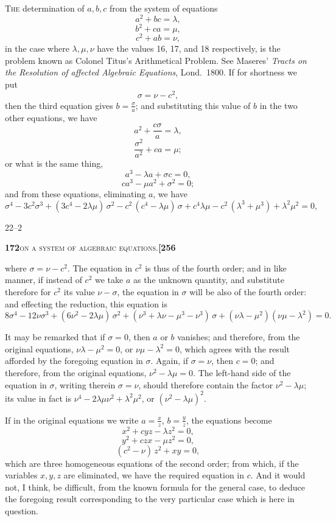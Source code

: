 \documentclass[11pt]{article}
\begin{document}
\textsc{The} determination of $a, b, c$ from the system of equations
\[
a^2 + bc = \lambda,
\]
\[
b^2 + ca = \mu,
\]
\[
c^2 + ab = \nu,
\]
in the case where $\lambda, \mu, \nu$ have the values 16, 17, and 18 respectively, is the problem known as Colonel Titus's Arithmetical Problem. See Maseres' \textit{Tracts on the Resolution of affected Algebraic Equations}, Lond.\ 1800. If for shortness we put
\[
\sigma = \nu - c^2,
\]
then the third equation gives $b = \tfrac{\sigma}{a}$; and substituting this value of $b$ in the two other equations, we have
\[
a^2 + \frac{c\sigma}{a} = \lambda,
\]
\[
\frac{\sigma^2}{a^2} + ca = \mu;
\]
or what is the same thing,
\[
a^3 - \lambda a + \sigma c = 0,
\]
\[
ca^3 - \mu a^2 + \sigma^2 = 0;
\]
and from these equations, eliminating $a$, we have
\[
\sigma^4 - 3c^2\sigma^3 + (3c^4 - 2\lambda\mu)\,\sigma^2 - c^2\,(c^4 - \lambda\mu)\,\sigma + c^4\lambda\mu - c^2\,(\lambda^3 + \mu^3) + \lambda^2\mu^2 = 0,
\]

\hfill 22--2

\newpage

\noindent\textbf{172}\hfill\textsc{on a system of algebraic equations.}\hfill\textbf{[256}

\medskip

\noindent where $\sigma = \nu - c^2$. The equation in $c^2$ is thus of the fourth order; and in like manner, if instead of $c^2$ we take $a$ as the unknown quantity, and substitute therefore for $c^2$ its value $\nu - \sigma$, the equation in $\sigma$ will be also of the fourth order: and effecting the reduction, this equation is
\[
8\sigma^4 - 12\nu\sigma^3 + (6\nu^2 - 2\lambda\mu)\,\sigma^2 + (\nu^3 + \lambda\nu - \mu^3 - \nu^3)\,\sigma + (\nu\lambda - \mu^2)(\nu\mu - \lambda^2) = 0.
\]

It may be remarked that if $\sigma = 0$, then $a$ or $b$ vanishes; and therefore, from the original equations, $\nu\lambda - \mu^2 = 0$, or $\nu\mu - \lambda^2 = 0$, which agrees with the result afforded by the foregoing equation in $\sigma$. Again, if $\sigma = \nu$, then $c = 0$; and therefore, from the original equations, $\nu^2 - \lambda\mu = 0$. The left-hand side of the equation in $\sigma$, writing therein $\sigma = \nu$, should therefore contain the factor $\nu^2 - \lambda\mu$; its value in fact is $\nu^4 - 2\lambda\mu\nu^2 + \lambda^2\mu^2$, or $(\nu^2 - \lambda\mu)^2$.

If in the original equations we write $a = \tfrac{x}{z}$, $b = \tfrac{y}{z}$, the equations become
\[
x^2 + cyz - \lambda z^2 = 0,
\]
\[
y^2 + czx - \mu z^2 = 0,
\]
\[
(c^2 - \nu)\,z^2 + xy = 0,
\]
which are three homogeneous equations of the second order; from which, if the variables $x, y, z$ are eliminated, we have the required equation in $c$. And it would not, I think, be difficult, from the known formula for the general case, to deduce the foregoing result corresponding to the very particular case which is here in question.
\end{document}
